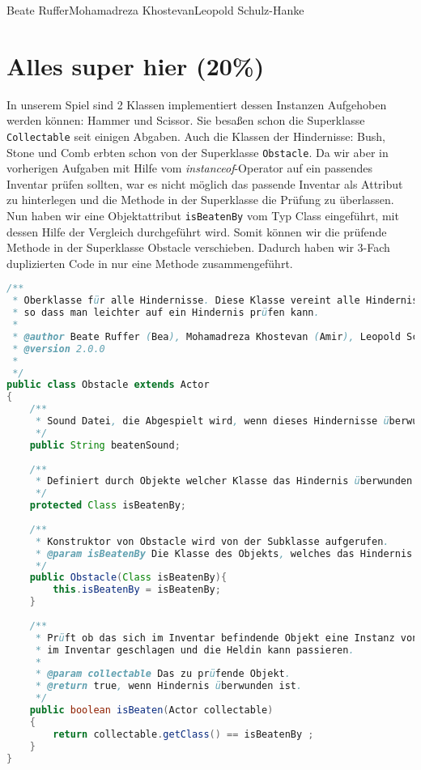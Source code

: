 \documentclass{pi1}
\begin{document}
		{Beate Ruffer}{Mohamadreza Khostevan}{Leopold Schulz-Hanke}

\section{Alles super hier (20\%)}
In unserem Spiel sind 2 Klassen implementiert dessen Instanzen Aufgehoben werden können: Hammer und Scissor. Sie besaßen schon die Superklasse \texttt{Collectable} seit einigen Abgaben. Auch die Klassen der Hindernisse: Bush, Stone und Comb erbten schon von der Superklasse \texttt{Obstacle}. Da wir aber in vorherigen Aufgaben mit Hilfe vom \emph{instanceof}-Operator auf ein passendes Inventar prüfen sollten, war es nicht möglich das passende Inventar als Attribut zu hinterlegen und die Methode in der Superklasse die Prüfung zu überlassen. Nun haben wir eine Objektattribut \texttt{isBeatenBy} vom Typ Class eingeführt, mit dessen Hilfe der Vergleich durchgeführt wird. Somit können wir die prüfende Methode in der Superklasse Obstacle verschieben. Dadurch haben wir 3-Fach duplizierten Code in nur eine Methode zusammengeführt.

\begin{lstlisting}[caption={Klasse \emph{Obstacle}}, firstnumber=3, language=Java]
/**
 * Oberklasse für alle Hindernisse. Diese Klasse vereint alle Hindernisse,
 * so dass man leichter auf ein Hindernis prüfen kann.
 * 
 * @author Beate Ruffer (Bea), Mohamadreza Khostevan (Amir), Leopold Schulz-Hanke (Leo) 
 * @version 2.0.0
 * 
 */
public class Obstacle extends Actor
{   
    /**
     * Sound Datei, die Abgespielt wird, wenn dieses Hindernisse überwunden wurde.
     */
    public String beatenSound;
    
    /**
     * Definiert durch Objekte welcher Klasse das Hindernis überwunden werden kann
     */
    protected Class isBeatenBy;
    
    /**
     * Konstruktor von Obstacle wird von der Subklasse aufgerufen.
     * @param isBeatenBy Die Klasse des Objekts, welches das Hindernis überwinden kann.
     */
    public Obstacle(Class isBeatenBy){
        this.isBeatenBy = isBeatenBy;
    }
    
    /**
     * Prüft ob das sich im Inventar befindende Objekt eine Instanz von isBeatenBy ist. Falls ja, wird das Hindernis von dem Objekt
     * im Inventar geschlagen und die Heldin kann passieren.
     * 
     * @param collectable Das zu prüfende Objekt.
     * @return true, wenn Hindernis überwunden ist.
     */
    public boolean isBeaten(Actor collectable)
    {
        return collectable.getClass() == isBeatenBy ;
    }
}

\end{lstlisting}
\end{document}
